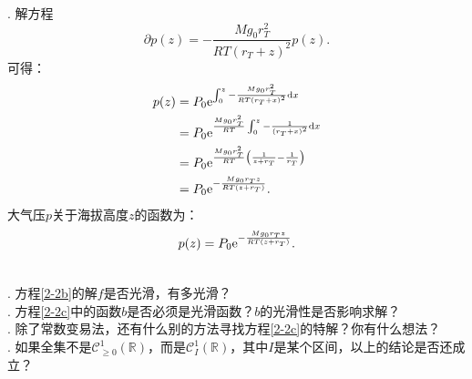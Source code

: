 \documentclass[12pt,UTF8]{ctexbook}
\begin{document}
\begin{so}
    . 解方程
    $$ \partial p(z) = -\frac{Mg_0r_T^2}{RT(r_T + z)^2} p(z). $$
    可得：
    \begin{align*}
        p(z) &= P_0\mathrm{e}^{\int_0^z -\frac{Mg_0r_T^2}{RT(r_T + x)^2}\mathrm{d}x} \\
        &= P_0\mathrm{e}^{\frac{Mg_0r_T^2}{RT}\int_0^z -\frac{1}{(r_T + x)^2}\mathrm{d}x} \\
        &= P_0\mathrm{e}^{\frac{Mg_0r_T^2}{RT}\left(\frac{1}{z + r_T} - \frac{1}{r_T}\right)} \\
        &= P_0\mathrm{e}^{-\frac{Mg_0r_Tz}{RT(z + r_T)}}.
    \end{align*}
    大气压$p$关于海拔高度$z$的函数为：
    $$ p(z) = P_0 \mathrm{e}^{-\frac{Mg_0r_Tz}{RT(z + r_T)}} . $$

\end{so}

\begin{sk}
    \mbox{} \\
    . 方程\eqref{2-2b}的解$f$是否光滑，有多光滑？\\
    . 方程\eqref{2-2c}中的函数$b$是否必须是光滑函数？$b$的光滑性是否影响求解？\\
    . 除了常数变易法，还有什么别的方法寻找方程\eqref{2-2c}的特解？你有什么想法？\\
    . 如果全集不是$\mathcal{C}^1_{\geqslant 0}(\mathbb{R})$，而是$\mathcal{C}^1_I(\mathbb{R})$，其中$I$是某个区间，以上的结论是否还成立？
    
\end{sk}
\end{document}
